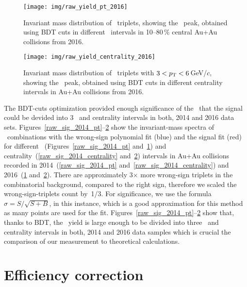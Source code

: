 \begin{figure}[!p]
\vspace{-0.7cm}
\centering
\texttt{[image: img/raw\_yield\_pt\_2016]}
\vspace{-0.5cm}
\caption{\label{raw_sig_2016_pt}Invariant mass distribution of \pKpi\ triplets, showing the \Lambdac\ peak, obtained using BDT cuts in different \pt\ intervals in 10--80$\,\%$ central Au+Au collisions from 2016.}
\end{figure}

\begin{figure}[!p]
\centering
\texttt{[image: img/raw\_yield\_centrality\_2016]}
\vspace{-0.5cm}
\caption{\label{raw_sig_2016_centrality}Invariant mass distribution of \pKpi\ triplets with $3 <{p_{\mathrm{T}}} < 6\,$GeV/$c$, showing the \Lambdac\ peak, obtained using BDT cuts in different centrality intervals in Au+Au collisions from 2016.}
\end{figure}

The BDT-cuts optimization provided enough significance of the \Lambdac\ that the signal could be devided into 3 \pt\ and centrality intervals in both, 2014 and 2016 data sets. Figures~\ref{raw_sig_2014_pt}--\ref{raw_sig_2016_centrality} show the invariant-mass spectra of \pKpi\ combinations with the wrong-sign polynomial fit (blue) and the signal fit (red) for different \pt~(Figures~\ref{raw_sig_2014_pt} and~\ref{raw_sig_2016_pt}) and centrality~(\ref{raw_sig_2014_centrality} and~\ref{raw_sig_2016_centrality}) intervals in Au+Au collisions recorded in 2014~(\ref{raw_sig_2014_pt} and~\ref{raw_sig_2014_centrality}) and 2016~(\ref{raw_sig_2016_pt} and~\ref{raw_sig_2016_centrality})\@. There are approximately 3$\times$ more wrong-sign triplets in the combinatorial background, compared to the right sign, therefore we scaled the wrong-sign-triplets count by~1/3\@. For significance, we use the formula $\sigma = S / \sqrt{S + B}$, in this instance, which is a good approximation for this method as many points are used for the fit. Figures~\ref{raw_sig_2014_pt}--\ref{raw_sig_2016_centrality} show that, thanks to BDT, the \Lambdacpm\ yield is large enough to be divided into three \pt\ and centrality intervals in both, 2014 and 2016 data samples which is crucial the comparison of our measurement to theoretical calculations.

\section{Efficiency correction}

